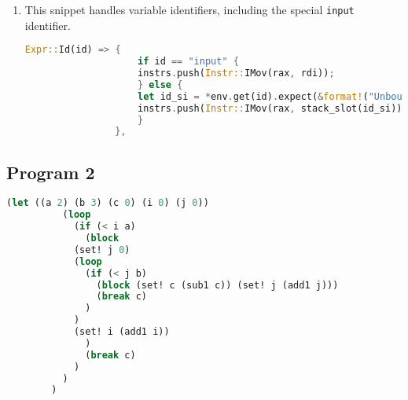 \begin{enumerate}
			\begin{enumerate}
				\item The instructions should not all begin with the same prefix for no reason because it is useless to do so. \verb|cargo clippy| warns about this:
					\begin{lstlisting}[numbers=none, language=bash, basicstyle=\ttfamily\small, title=\texttt{cargo clippy} output]
						warning: all variants have the same prefix: `I`
						  --> src/main.rs:26:1
						   |
						26 | / enum Instr {
						27 | |     IMov(Val, Val),
						28 | |     IAdd(Val, Val),
						29 | |     ISub(Val, Val),
						...  |
						46 | |     ILabel(i32),
						47 | | }
						   | |_^
						   |
						   = help: remove the prefixes and use full paths to the variants instead of glob imports
						   = help: for further information visit https://rust-lang.github.io/rust-clippy/master/index.html#enum_variant_names
						   = note: `#[warn(clippy::enum_variant_names)]` on by default
					\end{lstlisting}
				\item Labels do not have names that are useful for debugging. They are just \verb|.L<number>| or \verb|.E<number>|. It would be better to have the labels be named after the purpose. 
					For example, if the label is for the start of a loop, it could be named \verb|loop_start<number>| or something similar.
					Labels for error handling should also be named appropriately and stored in a human-readable way instead of just a negative number.
			\end{enumerate}

		\item This snippet handles variable identifiers, including the special \verb|input| identifier.
			\begin{lstlisting}[language=Rust]
				Expr::Id(id) => {
				    if id == "input" {
					instrs.push(Instr::IMov(rax, rdi));
				    } else {
					let id_si = *env.get(id).expect(&format!("Unbound variable identifier {}", id));
					instrs.push(Instr::IMov(rax, stack_slot(id_si)));
				    }
				},
			\end{lstlisting}
	\end{enumerate}

	\pagebreak
	\subsection{Program 2}
	\begin{lstlisting}[language=lisp, title=\texttt{example2.snek}]
		(let ((a 2) (b 3) (c 0) (i 0) (j 0))
		  (loop
		    (if (< i a)
		      (block
			(set! j 0)
			(loop
			  (if (< j b)
			    (block (set! c (sub1 c)) (set! j (add1 j)))
			    (break c)
			  )
			)
			(set! i (add1 i))
		      )
		      (break c)
		    )
		  )
		)
	\end{lstlisting}

